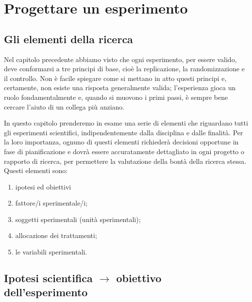 \documentclass[a4paper,12pt,oneside]{book}
\providecommand{\tightlist}{%
  \setlength{\itemsep}{0pt}\setlength{\parskip}{0pt}}
\begin{document}
\hypertarget{progettare-un-esperimento}{%
\chapter{Progettare un esperimento}\label{progettare-un-esperimento}}

\hypertarget{gli-elementi-della-ricerca}{%
\section{Gli elementi della ricerca}\label{gli-elementi-della-ricerca}}

Nel capitolo precedente abbiamo visto che ogni esperimento, per essere valido, deve conformarsi a tre principi di base, cioè la replicazione, la randomizzazione e il controllo. Non è facile spiegare come si mettano in atto questi principi e, certamente, non esiste una risposta generalmente valida; l'esperienza gioca un ruolo fondamentalmente e, quando si muovono i primi passi, è sempre bene cercare l'aiuto di un collega più anziano.

In questo capitolo prenderemo in esame una serie di elementi che riguardano tutti gli esperimenti scientifici, indipendentemente dalla disciplina e dalle finalità. Per la loro importanza, ognuno di questi elementi richiederà decisioni opportune in fase di pianificazione e dovrà essere accuratamente dettagliato in ogni progetto o rapporto di ricerca, per permettere la valutazione della bontà della ricerca stessa. Questi elementi sono:

\begin{enumerate}
\def\labelenumi{\arabic{enumi}.}
\tightlist
\item
  ipotesi ed obiettivi
\item
  fattore/i sperimentale/i;
\item
  soggetti sperimentali (unità sperimentali);
\item
  allocazione dei trattamenti;
\item
  le variabili sperimentali.
\end{enumerate}

\hypertarget{ipotesi-scientifica-rightarrow-obiettivo-dellesperimento}{%
\section{\texorpdfstring{Ipotesi scientifica \(\rightarrow\) obiettivo dell'esperimento}{Ipotesi scientifica \textbackslash rightarrow obiettivo dell'esperimento}}\label{ipotesi-scientifica-rightarrow-obiettivo-dellesperimento}}
\end{document}
